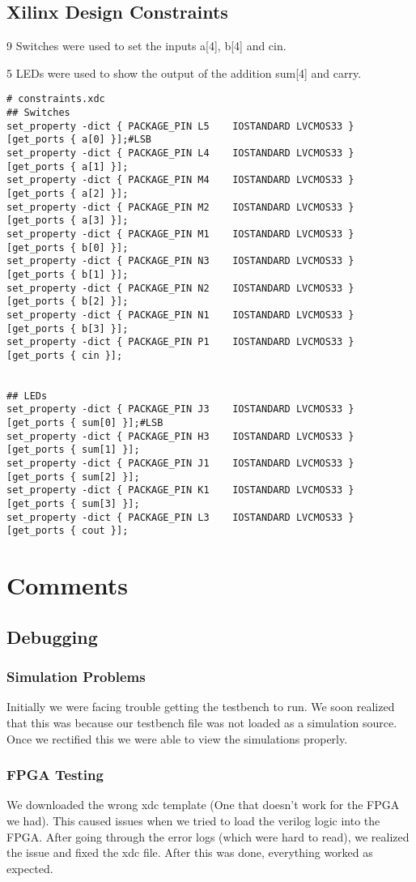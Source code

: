 \documentclass[a4paper]{article}
\begin{document}
\subsection{Xilinx Design Constraints}
9 Switches were used to set the inputs a[4], b[4] and cin.

5 LEDs were used to show the output of the addition sum[4] and carry.
\begin{verbatim}
# constraints.xdc
## Switches
set_property -dict { PACKAGE_PIN L5    IOSTANDARD LVCMOS33 } [get_ports { a[0] }];#LSB
set_property -dict { PACKAGE_PIN L4    IOSTANDARD LVCMOS33 } [get_ports { a[1] }];
set_property -dict { PACKAGE_PIN M4    IOSTANDARD LVCMOS33 } [get_ports { a[2] }];
set_property -dict { PACKAGE_PIN M2    IOSTANDARD LVCMOS33 } [get_ports { a[3] }];
set_property -dict { PACKAGE_PIN M1    IOSTANDARD LVCMOS33 } [get_ports { b[0] }];
set_property -dict { PACKAGE_PIN N3    IOSTANDARD LVCMOS33 } [get_ports { b[1] }];
set_property -dict { PACKAGE_PIN N2    IOSTANDARD LVCMOS33 } [get_ports { b[2] }];
set_property -dict { PACKAGE_PIN N1    IOSTANDARD LVCMOS33 } [get_ports { b[3] }];
set_property -dict { PACKAGE_PIN P1    IOSTANDARD LVCMOS33 } [get_ports { cin }];


## LEDs
set_property -dict { PACKAGE_PIN J3    IOSTANDARD LVCMOS33 } [get_ports { sum[0] }];#LSB
set_property -dict { PACKAGE_PIN H3    IOSTANDARD LVCMOS33 } [get_ports { sum[1] }];
set_property -dict { PACKAGE_PIN J1    IOSTANDARD LVCMOS33 } [get_ports { sum[2] }];
set_property -dict { PACKAGE_PIN K1    IOSTANDARD LVCMOS33 } [get_ports { sum[3] }];
set_property -dict { PACKAGE_PIN L3    IOSTANDARD LVCMOS33 } [get_ports { cout }];
\end{verbatim}
    
\pagebreak
\section{Comments}
\subsection{Debugging}
\subsubsection{Simulation Problems}
Initially we were facing trouble getting the testbench to run. We soon realized that this was because our testbench file was not loaded as a simulation source.
Once we rectified this we were able to view the simulations properly.
\subsubsection{FPGA Testing}
We downloaded the wrong xdc template (One that doesn't work for the FPGA we had). This caused issues when we tried to load the verilog logic into the FPGA. After going through the error logs (which were hard to read), we realized the issue and fixed the xdc file.
After this was done, everything worked as expected.
\end{document}
